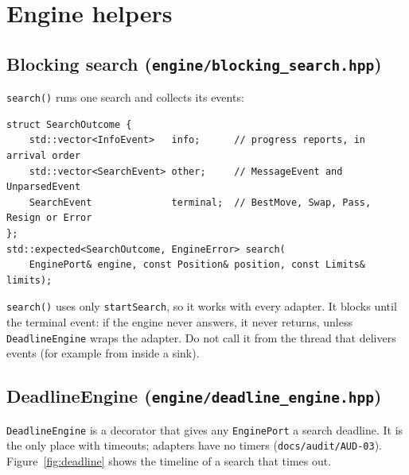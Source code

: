 \documentclass[11pt,a4paper]{article}
\newcommand{\code}[1]{\texttt{#1}}
\newcommand{\file}[1]{\texttt{#1}}
\begin{document}
\section{Engine helpers}

\subsection{Blocking search (\file{engine/blocking\_search.hpp})}

\code{search()} runs one search and collects its events:

\begin{lstlisting}
struct SearchOutcome {
    std::vector<InfoEvent>   info;      // progress reports, in arrival order
    std::vector<SearchEvent> other;     // MessageEvent and UnparsedEvent
    SearchEvent              terminal;  // BestMove, Swap, Pass, Resign or Error
};
std::expected<SearchOutcome, EngineError> search(
    EnginePort& engine, const Position& position, const Limits& limits);
\end{lstlisting}

\noindent \code{search()} uses only \code{startSearch}, so it works with every adapter. It blocks
until the terminal event: if the engine never answers, it never returns, unless
\code{DeadlineEngine} wraps the adapter. Do not call it from the thread that delivers events (for
example from inside a sink).

\subsection{DeadlineEngine (\file{engine/deadline\_engine.hpp})}\label{sec:deadline}

\code{DeadlineEngine} is a decorator that gives any \code{EnginePort} a search deadline. It is the
only place with timeouts; adapters have no timers (\file{docs/audit/AUD-03}).
Figure~\ref{fig:deadline} shows the timeline of a search that times out.
\end{document}
